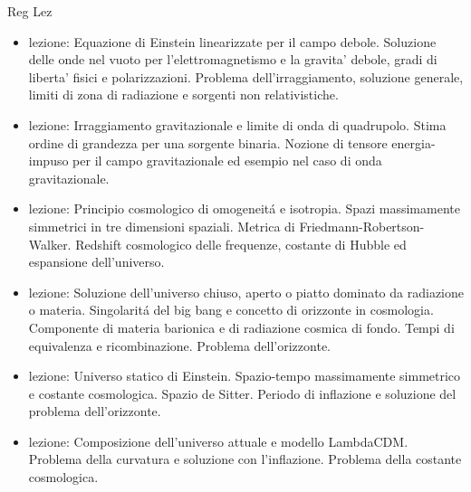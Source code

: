 \begin{frame}[allowframebreaks]{Reg Lez}
\begin{itemize}
\item lezione: Equazione di Einstein linearizzate per il campo debole. Soluzione delle onde nel vuoto per l'elettromagnetismo e la gravita' debole, gradi di liberta' fisici e polarizzazioni. Problema dell'irraggiamento, soluzione generale, limiti di zona di radiazione e sorgenti non relativistiche.

\item  lezione: Irraggiamento gravitazionale e limite di onda di quadrupolo. Stima ordine di grandezza per una sorgente binaria. Nozione di tensore energia-impuso per il campo gravitazionale ed esempio nel caso di onda gravitazionale.

\item  lezione: Principio cosmologico di omogeneit\'a e isotropia. Spazi massimamente simmetrici in tre dimensioni spaziali. Metrica di Friedmann-Robertson-Walker. Redshift cosmologico delle frequenze, costante di Hubble ed espansione dell'universo.

\item  lezione: Soluzione dell'universo chiuso, aperto o piatto dominato da radiazione o materia. Singolarit\'a del big bang e concetto di orizzonte in cosmologia. Componente di materia barionica e di radiazione cosmica di fondo. Tempi di equivalenza e ricombinazione. Problema dell'orizzonte. 

\item lezione: Universo statico di Einstein. Spazio-tempo massimamente simmetrico e costante cosmologica. Spazio de Sitter. Periodo di inflazione e soluzione del problema dell'orizzonte.

\item lezione: Composizione dell'universo attuale e modello LambdaCDM. Problema della curvatura e soluzione con l'inflazione. Problema della costante cosmologica. 

\end{itemize}

\end{frame}